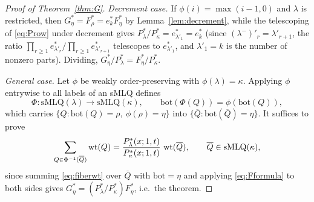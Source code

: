 \begin{proof}[Proof of Theorem~\ref{thm:G}]
\emph{Decrement case.} If $\phi(i)=\max(i-1,0)$ and $\lambda$ is restricted, then
$G^*_\eta=F^*_\rho=e^*_k F^*_\eta$ by Lemma~\ref{lem:decrement}, while the telescoping of \eqref{eq:Prow} under decrement gives $P^*_\lambda/P^*_\kappa=e^*_{\lambda'_1}=e^*_k$ (since $(\lambda^-)'_r=\lambda'_{r+1}$, the ratio $\prod_{r\ge1}e^*_{\lambda'_r}/\prod_{r\ge1}e^*_{\lambda'_{r+1}}$ telescopes to $e^*_{\lambda'_1}$, and $\lambda'_1=k$ is the number of nonzero parts).
Dividing, $G^*_\eta/P^*_\lambda=F^*_\eta/P^*_\kappa$.

\emph{General case.} Let $\phi$ be weakly order-preserving with $\phi(\lambda)=\kappa$.
Applying $\phi$ entrywise to all labels of an sMLQ defines
\[
\Phi:\mathrm{sMLQ}(\lambda)\to\mathrm{sMLQ}(\kappa),\qquad
\mathrm{bot}(\Phi(Q))=\phi(\mathrm{bot}(Q)),
\]
which carries $\{Q:\mathrm{bot}(Q)=\rho,\ \phi(\rho)=\eta\}$ into
$\{\overline Q:\mathrm{bot}(\overline Q)=\eta\}$. It suffices to prove
\begin{equation}\label{eq:fiberwt}
\sum_{Q\in\Phi^{-1}(\overline Q)}\operatorname{wt}(Q)
=\frac{P^*_\lambda(x;1,t)}{P^*_\kappa(x;1,t)}\,\operatorname{wt}(\overline Q),
\qquad \overline Q\in\mathrm{sMLQ}(\kappa),
\end{equation}
since summing \eqref{eq:fiberwt} over $\overline Q$ with $\mathrm{bot}=\eta$ and
applying \eqref{eq:Fformula} to both sides gives
$G^*_\eta=(P^*_\lambda/P^*_\kappa)F^*_\eta$, i.e.\ the theorem.


\end{proof}
